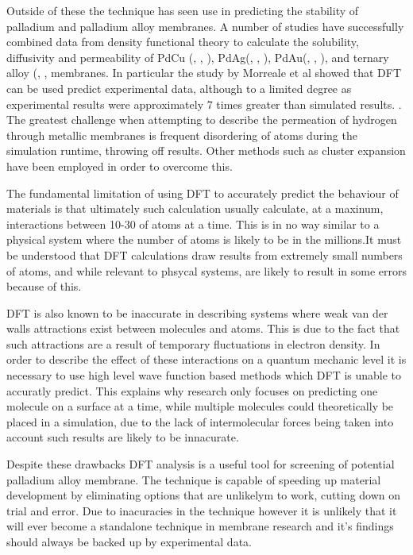 Outside of these the technique has seen use in predicting the stability of palladium and palladium alloy membranes. A number of studies have successfully combined data from density functional theory to calculate the solubility, diffusivity and permeability of PdCu (\cite{Kamakoti569}, \cite{KAMAKOTI2003145}, \cite{Kamiko2005}), PdAg(\cite{Sonwane2006}, \cite{doi:10.1021/jp064507t}, \cite{doi:10.1063/1.3656739}), PdAu(\cite{Sonwane2006}, \cite{doi:10.1021/jp064507t}, \cite{doi:10.1063/1.3656739}), and ternary alloy (\cite{Kamakoti2006}, \cite{SEMIDEYFLECHA2010384},\cite{LING2011189} membranes. In particular the study by Morreale et al showed that DFT can be used predict experimental data, although to a limited degree as experimental results were approximately 7 times greater than simulated results. \cite{Morreale2007}. The greatest challenge when attempting to describe the permeation of hydrogen through metallic membranes is frequent disordering of atoms during the simulation runtime, throwing off results. Other methods such as cluster expansion have been employed in order to overcome this. 

The fundamental limitation of using DFT to accurately predict the behaviour of materials is that ultimately such calculation usually calculate, at a maxinum, interactions between 10-30 of atoms at a time. This is in no way similar to a physical system where the number of atoms is likely to be in the millions.\cite{dftbook1}It must be understood that DFT calculations draw results from extremely small numbers of atoms, and while relevant to phsycal systems, are likely to result in some errors because of this. \cite{dftbook1}

DFT is also known to be inaccurate in describing systems where weak van der walls attractions exist between molecules and atoms. \cite{dftbook1} This is due to the fact that such attractions are a result of temporary fluctuations in electron density. In order to describe the effect of these interactions on a quantum mechanic level it is necessary to use high level wave function based methods which DFT is unable to accuratly predict. This explains why research only focuses on predicting one molecule on a surface at a time, while multiple molecules could theoretically be placed in a simulation, due to the lack of intermolecular forces being taken into account such results are likely to be innacurate. \cite{dftbook1}

Despite these drawbacks DFT analysis is a useful tool for screening of potential palladium alloy membrane. The technique is capable of speeding up material development by eliminating options that are unlikelym to work, cutting down on trial and error. Due to inacuracies in the technique however it is unlikely that it will ever become a standalone technique in membrane research and it's findings should always be backed up by experimental data.


